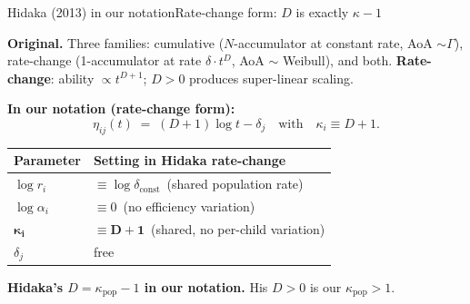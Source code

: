 \documentclass[aspectratio=169,t]{beamer}
\renewcommand{\arraystretch}{1.10}
\begin{document}
\begin{frame}{Hidaka (2013) in our notation}{Rate-change form: $D$ is exactly $\kappa - 1$}

\small
\textbf{Original.} Three families: cumulative ($N$-accumulator at constant rate,
AoA $\sim \Gamma$), rate-change (1-accumulator at rate $\delta\cdot t^D$,
AoA $\sim$ Weibull), and both. \textbf{Rate-change}: ability $\propto t^{D+1}$;
$D > 0$ produces super-linear scaling.

\vspace{0.6em}
\centering
\textbf{In our notation (rate-change form):}
\[
\eta_{ij}(t) \;=\; (D+1) \log t - \delta_j
\quad\text{with}\quad \kappa_i \equiv D+1.
\]

\vspace{0.4em}
\renewcommand{\arraystretch}{1.20}
\begin{tabular}{@{}ll@{}}
\toprule
\textbf{Parameter} & \textbf{Setting in Hidaka rate-change} \\
\midrule
$\log r_i$         & $\equiv \log\delta_{\text{const}}$ \,(shared population rate) \\
$\log\alpha_i$     & $\equiv 0$ \,(no efficiency variation) \\
$\boldsymbol{\kappa_i}$ & $\boldsymbol{\equiv D+1}$ \,(shared, no per-child variation) \\
$\delta_j$         & free \\
\bottomrule
\end{tabular}

\vspace{0.6em}
\textbf{Hidaka's $D = \kappa_{\text{pop}} - 1$ in our notation.}
His $D > 0$ is our $\kappa_{\text{pop}} > 1$.

\end{frame}
\end{document}
